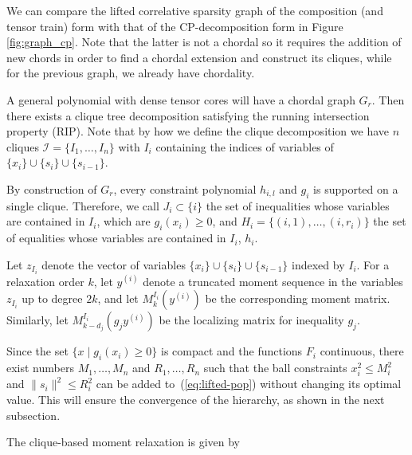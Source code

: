 \documentclass[11pt,a4paper]{article}
\theoremstyle{definition}
\begin{document}
We can compare the lifted correlative sparsity graph of the composition (and tensor train) form with that of the CP-decomposition form in Figure \ref{fig:graph_cp}. Note that the latter is not a chordal so it requires the addition of new chords in order to find a chordal extension and construct its cliques, while for the previous graph, we already have chordality.

A general polynomial with dense tensor cores will have a chordal graph $G_{r}$. Then there exists a clique tree decomposition satisfying the running intersection property (RIP). Note that by how we define the clique decomposition we have $n$ cliques $\mathcal{I}=\{I_1,\dots,I_n\}$ with $I_i$ containing the indices of variables of $\{x_i\} \cup \{s_{i}\} \cup \{s_{i-1}\}.$



By construction of $G_{r}$, every constraint polynomial $h_{i,l}$ and $g_i$ is supported on a single clique.
Therefore, we call $J_i \subset \{i\}$ the set of inequalities whose variables are contained in $I_i$, which are $g_i(x_i) \ge 0$, and $H_i = \{(i,1),\ldots,(i,r_i)\}$ the set of equalities whose variables are contained in $I_i$, $h_i$.

Let $z_{I_i}$ denote the vector of variables $\{x_i\} \cup \{s_{i}\} \cup \{s_{i-1}\}$ indexed by $I_i$. For a relaxation order $k$, let $y^{(i)}$ denote a truncated moment sequence in the variables $z_{I_i}$ up to degree $2k$, and let $M^{I_i}_k(y^{(i)})$ be the corresponding moment matrix. Similarly, let $M^{I_i}_{k-d_j}(g_j y^{(i)})$ be the localizing matrix for inequality $g_j$.

Since the set $\{x \mid g_i(x_i) \ge 0\}$ is compact and the functions $F_i$ continuous, there exist numbers $M_1,\ldots,M_n$ and $R_1,\ldots,R_n$ such that the ball constraints $x_i^2 \le M_i^2$ and $\|s_i\|^2 \le R_i^2$ can be added to~(\ref{eq:lifted-pop}) without changing its optimal value. This will ensure the convergence of the hierarchy, as shown in the next subsection.

The clique-based moment relaxation is given by
\end{document}
